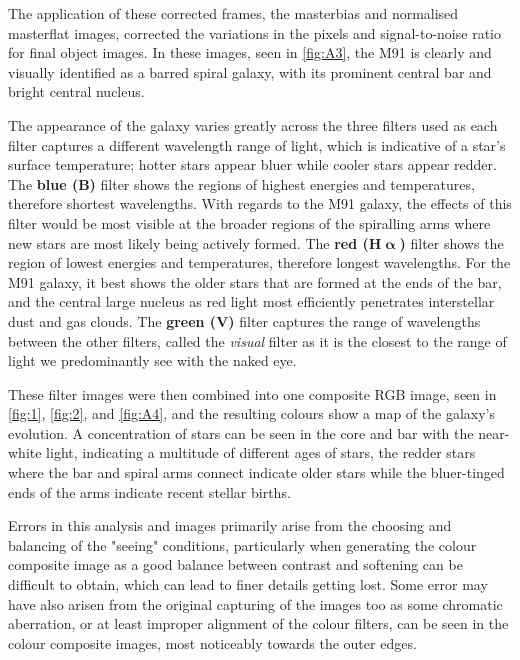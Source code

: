 \documentclass[11pt, a4paper, twocolumn]{article}
\begin{document}
The application of these corrected frames, the masterbias and normalised masterflat images, corrected the variations in the pixels and signal-to-noise ratio for final object images. In these images, seen in \autoref{fig:A3}, the M91 is clearly and visually identified as a barred spiral galaxy, with its prominent central bar and bright central nucleus.

The appearance of the galaxy varies greatly across the three filters used as each filter captures a different wavelength range of light, which is indicative of a star's surface temperature; hotter stars appear bluer while cooler stars appear redder. The \textbf{blue (B)} filter shows the regions of highest energies and temperatures, therefore shortest wavelengths. With regards to the M91 galaxy, the effects of this filter would be most visible at the broader regions of the spiralling arms where new stars are most likely being actively formed. The \textbf{red (H$\mathbf{\upalpha}$)} filter shows the region of lowest energies and temperatures, therefore longest wavelengths. For the M91 galaxy, it best shows the older stars that are formed at the ends of the bar, and the central large nucleus as red light most efficiently penetrates interstellar dust and gas clouds. The \textbf{green (V)} filter captures the range of wavelengths between the other filters, called the \textit{visual} filter as it is the closest to the range of light we predominantly see with the naked eye.

These filter images were then combined into one composite RGB image, seen in \autoref{fig:1}, \autoref{fig:2}, and \autoref{fig:A4}, and the resulting colours show a map of the galaxy's evolution. A concentration of stars can be seen in the core and bar with the near-white light, indicating a multitude of different ages of stars, the redder stars where the bar and spiral arms connect indicate older stars while the bluer-tinged ends of the arms indicate recent stellar births.

Errors in this analysis and images primarily arise from the choosing and balancing of the "seeing" conditions, particularly when generating the colour composite image as a good balance between contrast and softening can be difficult to obtain, which can lead to finer details getting lost. Some error may have also arisen from the original capturing of the images too as some chromatic aberration, or at least improper alignment of the colour filters, can be seen in the colour composite images, most noticeably towards the outer edges.
\end{document}
